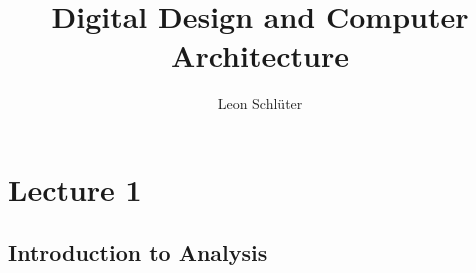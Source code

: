 \documentclass[a4paper,10pt]{article}
\title{Digital Design and Computer Architecture}
\author{Leon Schlüter}
\begin{document}
\maketitle
    \section{Lecture 1}
    \subsection{Introduction to Analysis}
\end{document}
